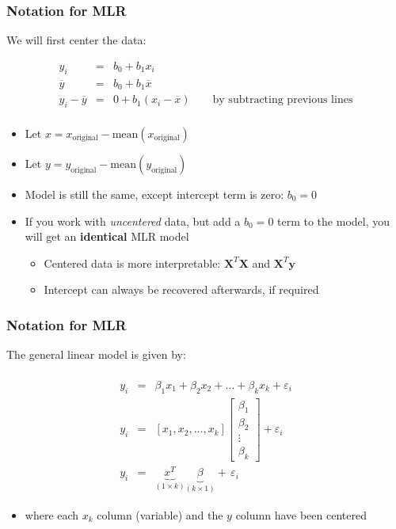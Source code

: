 \begin{frame}\frametitle{Notation for MLR}

	We will first center the data:

	$$
	\begin{array}{rcl}
		y_i &=& b_0 + b_1 x_i \\
		\overline{y} &=& b_0 + b_1 \overline{x} \\
		y_i - \overline{y} &=& 0 +b_1(x_i - \overline{x}) \qquad \text{by subtracting previous lines} \\
	\end{array}
	$$
	\begin{itemize}
		\item	Let $x = x_\text{original} - \text{mean}\left(x_\text{original} \right)$
		\item	Let $y = y_\text{original} - \text{mean}\left(y_\text{original} \right)$
		\item	Model is still the same, except intercept term is zero: $b_0 = 0$
	\end{itemize}
	\begin{itemize}
		\item	If you work with \emph{uncentered} data, but add a $b_0 = 0$ term to the model, you will get an \textbf{identical} MLR model
		\begin{itemize}
			\item	Centered data is more interpretable: $\mathbf{X}^T\mathbf{X}$ and $\mathbf{X}^T\mathbf{y}$
			\item	Intercept can always be recovered afterwards, if required
		\end{itemize}
	\end{itemize}
\end{frame}

\begin{frame}\frametitle{Notation for MLR}

	The general linear model is given by:

	$$
	\begin{array}{rcl}
		\\
		y_i &=& \beta_1 x_1 + \beta_2x_2 + \ldots + \beta_kx_k + \varepsilon_i \\
		y_i &=& [x_1, x_2, \ldots, x_k]
		\begin{bmatrix}
			\beta_1 \\
			\beta_2 \\
			\vdots \\
			\beta_k
		\end{bmatrix}
		+ \varepsilon_i \\
		y_i &=& \underbrace{\mathit{x}^T}_{(1 \times k)} \underbrace{\beta}_{(k \times 1)} + \,\varepsilon_i
	\end{array}
	$$
	\begin{itemize}
		\item	where each $x_k$ column (variable) and the $y$ column have been centered
	\end{itemize}
\end{frame}

